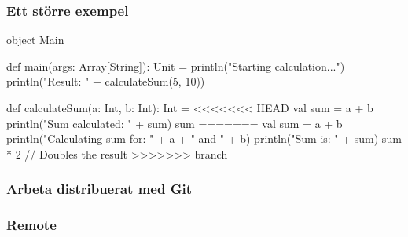 \begin{frame}[fragile]
    \frametitle{Ett större exempel}

    \begin{GobbleCode}[2pt]{6}
        object Main {
            def main(args: Array[String]): Unit = {
                println("Starting calculation...")
                println("Result: " + calculateSum(5, 10))
            }

            def calculateSum(a: Int, b: Int): Int = {
        <<<<<<< HEAD
                val sum = a + b
                println("Sum calculated: " + sum)
                sum
        =======
                val sum = a + b
                println("Calculating sum for: " + a + " and " + b)
                println("Sum is: " + sum)
                sum * 2 // Doubles the result
        >>>>>>> branch
            }
        }
    \end{GobbleCode}
    
\end{frame}

\begin{frame}
    \frametitle{Arbeta distribuerat med Git}

    \begin{itemize}
        \begin{itemize}
        \end{itemize}
    \end{itemize}
    
\end{frame}

\begin{frame}
    \frametitle{Remote}

    \begin{itemize}
    \end{itemize}
    
\end{frame}

